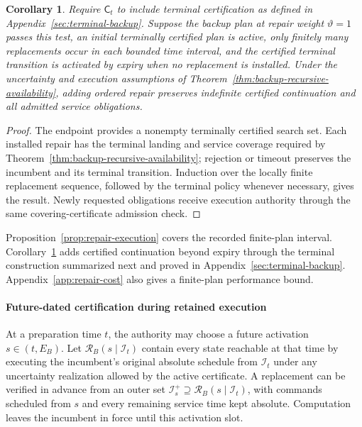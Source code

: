 \documentclass[journal,10pt]{IEEEtran}
\newtheorem{corollary}{Corollary}
\newcommand{\appref}[1]{Appendix~\ref{#1}}
\begin{document}
\begin{corollary}
\label{cor:repair-recursive}
Require $\mathsf C_t$ to include terminal certification as defined in
\appref{sec:terminal-backup}. Suppose the backup plan at repair weight
$\vartheta=1$ passes this test, an initial terminally certified plan is
active, only finitely many replacements occur in each bounded time
interval, and the certified terminal transition is activated by expiry
when no replacement is installed. Under the
uncertainty and execution assumptions of
Theorem~\ref{thm:backup-recursive-availability}, adding ordered repair
preserves indefinite certified continuation and all admitted service
obligations.
\end{corollary}
\begin{proof}
The endpoint provides a nonempty terminally certified search set. Each
installed repair has the terminal landing and service coverage required by
Theorem~\ref{thm:backup-recursive-availability}; rejection or timeout preserves
the incumbent and its terminal transition. Induction over the locally finite
replacement sequence, followed by the terminal policy whenever necessary,
gives the result. Newly requested obligations receive execution authority
through the same covering-certificate admission check.
\end{proof}

Proposition~\ref{prop:repair-execution} covers the recorded finite-plan
interval. Corollary~\ref{cor:repair-recursive} adds certified continuation
beyond expiry through the terminal construction summarized next and proved in
\appref{sec:terminal-backup}. \appref{app:repair-cost} also gives
a finite-plan performance bound.

\paragraph{Future-dated certification during retained execution}
\label{sec:planned-handover}
At a preparation time $t$, the authority may choose a future activation
$s\in(t,E_B)$. Let $\mathcal R_B(s\mid\mathcal I_t)$ contain every state
reachable at that time by executing the incumbent's original absolute
schedule from $\mathcal I_t$ under any uncertainty realization allowed by
the active certificate. A
replacement can be verified in advance from an outer set
$\mathcal I_s^+\supseteq\mathcal R_B(s\mid\mathcal I_t)$, with commands
scheduled from $s$ and every remaining service time kept absolute.
Computation leaves the incumbent in force until this activation slot.
\end{document}
